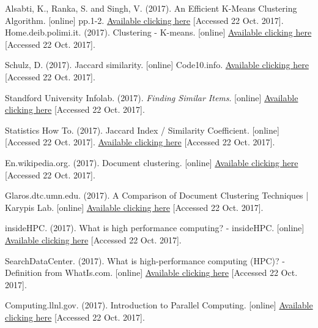 \documentclass[fleqn,10pt]{SelfArx} %
\begin{document}
\begin{thebibliography}{9}

Alsabti, K., Ranka, S. and Singh, V. (2017). An Efficient K-Means Clustering Algorithm. [online] pp.1-2. \href{https://www.cs.utexas.edu/~kuipers/readings/Alsabti-hpdm-98.pdf}{Available clicking here} [Accessed 22 Oct. 2017].
Home.deib.polimi.it. (2017). Clustering - K-means. [online] \href{http://home.deib.polimi.it/matteucc/Clustering/tutorial_html/kmeans.html}{Available clicking here} [Accessed 22 Oct. 2017].


Schulz, D. (2017). Jaccard similarity. [online] Code10.info. 
\href{http://www.code10.info/index.php?option=com_content&view=article&id=60:articlejaccard-similarity&catid=38:cat_coding_algorithms_data-similarity&Itemid=57}{Available clicking here} [Accessed 22 Oct. 2017].


Standford University Infolab. (2017). \textit{Finding Similar Items}. [online] \href{http://infolab.stanford.edu/~ullman/mmds/ch3.pdf}{Available clicking here} [Accessed 22 Oct. 2017].

Statistics How To. (2017). Jaccard Index / Similarity Coefficient. [online] [Accessed 22 Oct. 2017].
\href{http://www.statisticshowto.com/jaccard-index/}{Available clicking here}  [Accessed 22 Oct. 2017].


En.wikipedia.org. (2017). Document clustering. [online] \href{https://en.wikipedia.org/wiki/Document_clustering}{Available clicking here} [Accessed 22 Oct. 2017].

Glaros.dtc.umn.edu. (2017). A Comparison of Document Clustering Techniques | Karypis Lab. [online] \href{http://glaros.dtc.umn.edu/gkhome/node/157}{Available clicking here} [Accessed 22 Oct. 2017].

insideHPC. (2017). What is high performance computing? - insideHPC. [online] \href{https://insidehpc.com/hpc-basic-training/what-is-hpc/}{Available clicking here}  [Accessed 22 Oct. 2017].

SearchDataCenter. (2017). What is high-performance computing (HPC)? - Definition from WhatIs.com. [online] 
\href{http://searchdatacenter.techtarget.com/definition/high-performance-computing-HPC}{Available clicking here}   [Accessed 22 Oct. 2017].


Computing.llnl.gov. (2017). Introduction to Parallel Computing. [online] \href{https://computing.llnl.gov/tutorials/parallel_comp/}{Available clicking here}  [Accessed 22 Oct. 2017].



\end{thebibliography}
\end{document}
